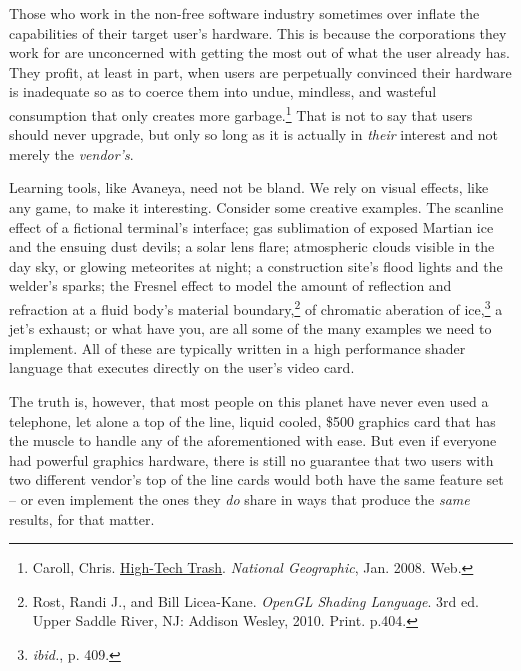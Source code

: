Those who work in the non-free software industry sometimes over inflate the capabilities of their target user's hardware. This is because the corporations they work for are unconcerned with getting the most out of what the user already has. They profit, at least in part, when users are perpetually convinced their hardware is inadequate so as to coerce them into undue, mindless, and wasteful consumption that only creates more garbage.\footnote{Caroll, Chris. \href{http://ngm.nationalgeographic.com/2008/01/high-tech-trash/carroll-text}{High-Tech Trash}. {\it National Geographic}, Jan. 2008. Web.} That is not to say that users should never upgrade, but only so long as it is actually in {\it their} interest and not merely the {\it vendor's}.
    {}

Learning tools, like Avaneya, need not be bland. We rely on visual effects, like any game, to make it interesting. Consider some creative examples. The scanline effect of a fictional terminal's interface; gas sublimation of exposed Martian ice and the ensuing dust devils; a solar lens flare; atmospheric  clouds visible in the day sky, or glowing meteorites at night; a construction site's flood lights and the welder's sparks; the Fresnel effect to model the amount of reflection and refraction at a fluid body's material boundary,\footnote{Rost, Randi J., and Bill Licea-Kane. {\it OpenGL Shading Language}. 3rd ed. Upper Saddle River, NJ: Addison Wesley, 2010. Print. p.404.} of chromatic aberation of ice,\footnote{{\it ibid.}, p. 409.} a jet's exhaust; or what have you, are all some of the many examples we need to implement. All of these are typically written in a high performance shader language that executes directly on the user's video card.

The truth is, however, that most people on this planet have never even used a telephone, let alone a top of the line, liquid cooled, \$500 graphics card that has the muscle to handle any of the aforementioned with ease. But even if everyone had powerful graphics hardware, there is still no guarantee that two users with two different vendor's top of the line cards would both have the same feature set -- or even implement the ones they {\it do} share in ways that produce the {\it same} results, for that matter. 

